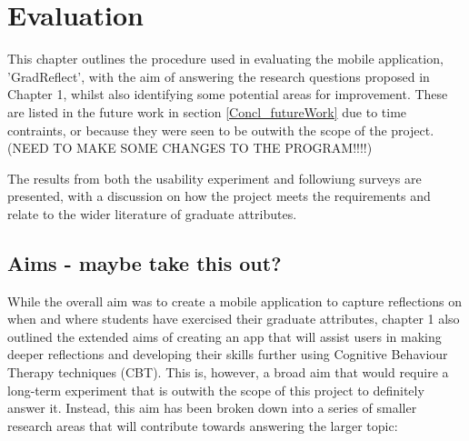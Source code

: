 \documentclass{l4proj}
\begin{document}


\chapter{Evaluation} \label{evaluation}

This chapter outlines the procedure used in evaluating the mobile application, 'GradReflect', with the aim of answering the research questions proposed in Chapter 1, whilst also identifying some potential areas for improvement. These are listed in the future work in section \ref{Concl_futureWork} due to time contraints, or because they were seen to be outwith the scope of the project. (NEED TO MAKE SOME CHANGES TO THE PROGRAM!!!!)

The results from both the usability experiment and followiung surveys are presented, with a discussion on how the project meets the requirements and relate to the wider literature of graduate attributes. 

\section{Aims - maybe take this out?} \label{evalAims}

While the overall aim was to create a mobile application to capture reflections on when and where students have exercised their graduate attributes, chapter 1 also outlined the extended aims of creating an app that will assist users in making deeper reflections and developing their skills further using Cognitive Behaviour Therapy techniques (CBT). This is, however, a broad aim that would require a long-term experiment that is outwith the scope of this project to definitely answer it. Instead, this aim has been broken down into a series of smaller research areas that will contribute towards answering the larger topic:
\end{document}
